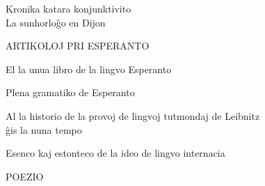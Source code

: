 {\newpage

Kronika katara konjunktivito \Dotfill \pageref{kronika} \\
La sunhorloĝo en Dijon \Dotfill \pageref{dijon} 

{\centering \sansfont ARTIKOLOJ PRI ESPERANTO\par}
\vspace{1em}

{ %

\setlength{\leftskip}{1em}
\setlength{\parindent}{-1em}
\setlength{\parskip}{0pt}

El la unua libro de la lingvo Esperanto \Dotfill \pageref{unualibro}

Plena gramatiko de Esperanto  \Dotfill \pageref{plena} 

Al la historio de la provoj de lingvoj tutmondaj de Leibnitz \\ ĝis la
  nuna tempo  \Dotfill \pageref{leibnitz} 
  
Esenco kaj estonteco de la ideo de lingvo internacia  \Dotfill \pageref{esenco} 

} %

{\centering \sansfont POEZIO\par}

}
